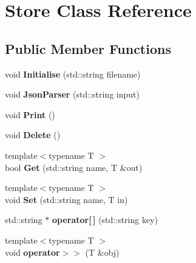 \hypertarget{classStore}{\section{Store Class Reference}
\label{classStore}
}
\subsection*{Public Member Functions}
\begin{DoxyCompactItemize}
\item 
\hypertarget{classStore_af5e0db5a37234365c4deb5bedd76693c}{void {\bfseries Initialise} (std\-::string filename)}\label{classStore_af5e0db5a37234365c4deb5bedd76693c}

\item 
\hypertarget{classStore_adb84e3fb286cae07f64e8186b7ab04e1}{void {\bfseries Json\-Parser} (std\-::string input)}\label{classStore_adb84e3fb286cae07f64e8186b7ab04e1}

\item 
\hypertarget{classStore_a9d2f000bd849a9f5de71c3ba62dca340}{void {\bfseries Print} ()}\label{classStore_a9d2f000bd849a9f5de71c3ba62dca340}

\item 
\hypertarget{classStore_a7fce0f8f3ec7978c5e7cd3d7053f899b}{void {\bfseries Delete} ()}\label{classStore_a7fce0f8f3ec7978c5e7cd3d7053f899b}

\item 
\hypertarget{classStore_abdc0134daa34b808328070f5d6b295f3}{{\footnotesize template$<$typename T $>$ }\\bool {\bfseries Get} (std\-::string name, T \&out)}\label{classStore_abdc0134daa34b808328070f5d6b295f3}

\item 
\hypertarget{classStore_af586739813ce18da6f5e3561d134a814}{{\footnotesize template$<$typename T $>$ }\\void {\bfseries Set} (std\-::string name, T in)}\label{classStore_af586739813ce18da6f5e3561d134a814}

\item 
\hypertarget{classStore_a790ca02bc7d11648edf0c8d5df3751fe}{std\-::string $\ast$ {\bfseries operator\mbox{[}$\,$\mbox{]}} (std\-::string key)}\label{classStore_a790ca02bc7d11648edf0c8d5df3751fe}

\item 
\hypertarget{classStore_abe9b65d1308c43dc4158b00d6aed7385}{{\footnotesize template$<$typename T $>$ }\\void {\bfseries operator$>$$>$} (T \&obj)}\label{classStore_abe9b65d1308c43dc4158b00d6aed7385}

\end{DoxyCompactItemize}
